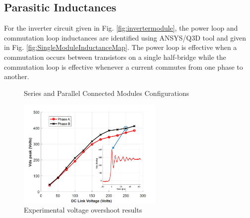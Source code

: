 \subsection{Parasitic Inductances}

For the inverter circuit given in Fig. \ref{fig:invertermodule}, the power loop and commutation loop inductances are identified using ANSYS/Q3D tool and given in Fig. \ref{fig:SingleModuleInductanceMap}. The power loop is effective when a commutation occurs between transistors on a single half-bridge while the commutation loop is effective whenever a current commutes from one phase to another.

\begin{figure}[tb]
\begin{minipage}[b]{0.6\linewidth}
\centering
{}\quad
{}
\caption{\label{fig:ModuleConnections}Series and Parallel Connected Modules Configurations}
\end{minipage}
\begin{minipage}[b]{0.4\linewidth}
\centering
\includegraphics[width=7cm]{figures/experimentalvds2.jpg}
\caption{Experimental voltage overshoot results}
\label{fig:experimentalvds2}
\end{minipage}
\end{figure}

